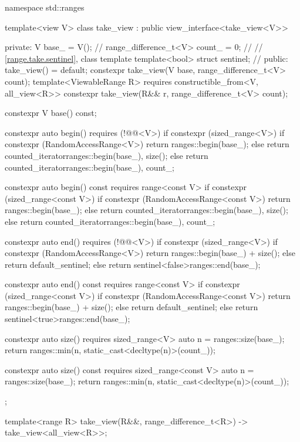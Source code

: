 \begin{codeblock}
namespace std::ranges {
  template<view V>
  class take_view : public view_interface<take_view<V>> {
  private:
    V base_ = V();                                      // \expos
    range_difference_t<V> count_ = 0;                   // \expos
    // \ref{range.take.sentinel}, class template 
    template<bool> struct sentinel;                     // \expos
  public:
    take_view() = default;
    constexpr take_view(V base, range_difference_t<V> count);
    template<ViewableRange R>
      requires constructible_from<V, all_view<R>>
    constexpr take_view(R&& r, range_difference_t<V> count);

    constexpr V base() const;

    constexpr auto begin() requires (!@@<V>) {
      if constexpr (sized_range<V>) {
        if constexpr (RandomAccessRange<V>)
          return ranges::begin(base_);
        else
          return counted_iterator{ranges::begin(base_), size()};
      } else
        return counted_iterator{ranges::begin(base_), count_};
    }

    constexpr auto begin() const requires range<const V> {
      if constexpr (sized_range<const V>) {
        if constexpr (RandomAccessRange<const V>)
          return ranges::begin(base_);
        else
          return counted_iterator{ranges::begin(base_), size()};
      } else
        return counted_iterator{ranges::begin(base_), count_};
    }

    constexpr auto end() requires (!@@<V>) {
      if constexpr (sized_range<V>) {
        if constexpr (RandomAccessRange<V>)
          return ranges::begin(base_) + size();
        else
          return default_sentinel;
      } else
        return sentinel<false>{ranges::end(base_)};
    }

    constexpr auto end() const requires range<const V> {
      if constexpr (sized_range<const V>) {
        if constexpr (RandomAccessRange<const V>)
          return ranges::begin(base_) + size();
        else
          return default_sentinel;
      } else
        return sentinel<true>{ranges::end(base_)};
    }

    constexpr auto size() requires sized_range<V> {
      auto n = ranges::size(base_);
      return ranges::min(n, static_cast<decltype(n)>(count_));
    }

    constexpr auto size() const requires sized_range<const V> {
      auto n = ranges::size(base_);
      return ranges::min(n, static_cast<decltype(n)>(count_));
    }
  };

  template<range R>
    take_view(R&&, range_difference_t<R>)
      -> take_view<all_view<R>>;
}
\end{codeblock}


